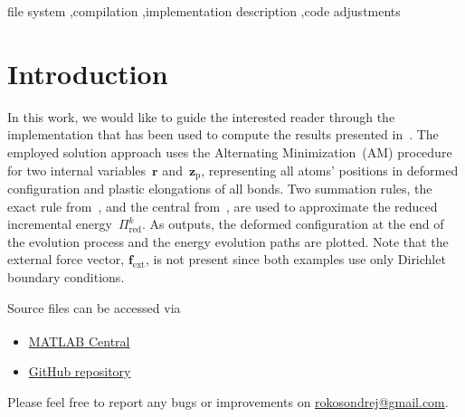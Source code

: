 \documentclass[preprint,12pt,authoryear]{elsarticle}
\newcommand{\bs}[1]{{\boldsymbol{#1}}}
\begin{document}
\begin{frontmatter}
\begin{keyword}
file system \sep compilation \sep implementation description \sep code adjustments


\end{keyword}

\end{frontmatter}



\tableofcontents

%
%
\section{Introduction}
\label{Sect:1}
%
In this work, we would like to guide the interested reader through the implementation that has been used to compute the results presented in~\cite[Section~5]{RokosQC}. The employed solution approach uses the Alternating Minimization~(AM) procedure for two internal variables~$\bs{r}$ and~$\bs{z}_\mathrm{p}$, representing all atoms' positions in deformed configuration and plastic elongations of all bonds. Two summation rules, the exact rule from~\cite{BeexQC}, and the central from~\cite{BeexCSumRule}, are used to approximate the reduced incremental energy~$\Pi^k_\mathrm{red}$. As outputs, the deformed configuration at the end of the evolution process and the energy evolution paths are plotted. Note that the external force vector, $\bs{f}_\mathrm{ext}$, is not present since both examples use only Dirichlet boundary conditions.

Source files can be accessed via
%
\begin{itemize}
\item \href{https://www.mathworks.com/matlabcentral/fileexchange/60701-rokosondrej-variational-qc-plasticity}{MATLAB\textsuperscript{\textregistered} Central}
\item \href{https://github.com/rokosondrej/Variational_QC-plasticity}{GitHub repository}
\end{itemize}
%

Please feel free to report any bugs or improvements on \href{mailto:ondrej.rokos@fsv.cvut.cz}{rokosondrej@gmail.com}.
%
%
\end{document}
